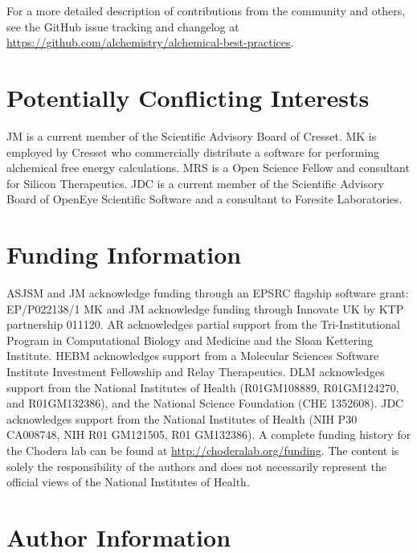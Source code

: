 \documentclass[9pt,bestpractices,pubversion]{livecoms}
\newcommand{\githubrepository}{\url{https://github.com/alchemistry/alchemical-best-practices}} %
\begin{document}
For a more detailed description of contributions from the community and others, 
see the GitHub issue tracking and changelog at \githubrepository.


\section*{Potentially Conflicting Interests}
JM is a current member of the Scientific Advisory Board of Cresset. 
MK is employed by Cresset who commercially distribute a software for performing alchemical free energy calculations. MRS is a Open Science Fellow and consultant for Silicon Therapeutics.
JDC is a current member of the Scientific Advisory Board of OpenEye Scientific Software and a consultant to Foresite Laboratories.
\section*{Funding Information}
ASJSM and JM acknowledge funding through an EPSRC flagship software grant: EP/P022138/1
MK and JM acknowledge funding through Innovate UK by KTP partnership 011120.
AR acknowledges partial support from the Tri-Institutional Program in Computational Biology and Medicine and the Sloan Kettering Institute.
HEBM acknowledges support from a Molecular Sciences Software Institute Investment Fellowship and Relay Therapeutics.
DLM acknowledges support from the National Institutes of Health (R01GM108889, R01GM124270, and R01GM132386), and the National Science Foundation (CHE 1352608).
JDC acknowledges support from the National Institutes of Health (NIH P30 CA008748, NIH R01 GM121505, R01 GM132386).
A complete funding history for the Chodera lab can be found at \url{http://choderalab.org/funding}.
The content is solely the responsibility of the authors and does not necessarily represent the official views of the National Institutes of Health.

\section*{Author Information}
\makeorcid



\end{document}
